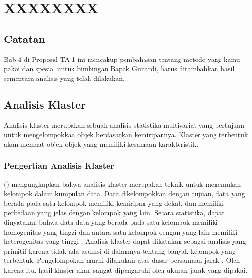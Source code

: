 \chapter{XXXXXXXX}

\section{Catatan}
Bab 4 di Proposal TA 1 ini mencakup pembahasan tentang metode yang kamu pakai dan spesial untuk bimbingan Bapak Gunardi, harus ditambahkan hasil sementara analisis yang telah dilakukan.

\section{Analisis Klaster}
Analisis klaster merupakan sebuah analisis statistika multivariat yang bertujuan untuk mengelompokkan objek berdasarkan kemiripannya. Klaster yang terbentuk akan memuat objek-objek yang memiliki kesamaan karakteristik.

\subsection{Pengertian Analisis Klaster}
\citeauthor{kaufman} (\citeyear{kaufman}) mengungkapkan bahwa analisis klaster merupakan teknik untuk menemukan kelompok dalam kumpulan data. Data dikelompokkan dengan tujuan, data yang berada pada satu kelompok memiliki kemiripan yang dekat, dan memiliki perbedaan yang jelas dengan kelompok yang lain. Secara statistika, dapat dinyatakan bahwa data-data yang berada pada satu kelompok memiliki homogenitas yang tinggi dan antara satu kelompok dengan yang lain memiliki heterogenitas yang tinggi \citep{hair}. Analisis klaster dapat dikatakan sebagai analisis yang primitif karena tidak ada asumsi di dalamnya tentang banyak kelompok yang terbentuk. Pengelompokan murni dilakukan atas dasar persamaan jarak \citep{johnsonwichern}. Oleh karena itu, hasil klaster akan sangat dipengaruhi oleh ukuran jarak yang dipakai.


